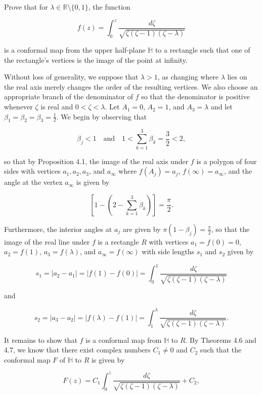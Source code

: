 Prove that for $\lambda \in \mathbb{R} \setminus \{0, 1\}$, the function

$$
f(z) = \int_0^z \frac{d\zeta}{\sqrt{\zeta (\zeta - 1)(\zeta - \lambda)}}
$$

is a conformal map from the upper half-plane $\mathbb{H}$ to a rectangle such that one of the rectangle's vertices is 
the image of the point at infinity.

\begin{solution} 
  Without loss of generality, we suppose that $\lambda > 1$, as changing where $\lambda$ lies on the real axis merely 
  changes the order of the resulting vertices. We also choose an appropriate branch of the denominator of $f$ so that 
  the denominator is positive whenever $\zeta$ is real and $0 < \zeta < \lambda$. Let $A_1 = 0$, $A_2 = 1$, and 
  $A_3 = \lambda$ and let $\beta_1 = \beta_2 = \beta_3 = \frac{1}{2}$. We begin by observing that 

  $$
  \beta_j < 1 \quad \text{and} \quad 1 < \sum_{k=1}^{3} \beta_k = \frac{3}{2} < 2,
  $$

  so that by Proposition 4.1, the image of the real axis under $f$ is a polygon of four sides with vertices 
  $a_1, a_2, a_3$, and $a_{\infty}$ where $f(A_j) = a_j$, $f(\infty) = a_{\infty}$, and the angle at the vertex 
  $a_{\infty}$ is given by 
  
  $$
    \left[1 - \left(2 - \sum\limits_{k = 1}^3 \beta_k \right) \right] = \frac{\pi}{2}.
  $$

  Furthermore, the interior angles at $a_j$ are given by $\pi (1 - \beta_j) = \frac{\pi}{2}$, so that the image of the 
  real line under $f$ is a rectangle $R$ with vertices $a_1 = f(0) = 0$, $a_2 = f(1)$, $a_3 = f(\lambda)$, and 
  $a_{\infty} = f(\infty)$ with side lengths $s_1$ and $s_2$ given by
 
  $$
  s_1 = |a_2 - a_1| = \left|f(1) - f(0)\right| = \int_0^1 \frac{d\zeta}{\sqrt{\zeta(\zeta - 1)(\zeta - \lambda)}}
  $$

  and 

  $$
  s_2 = |a_3 - a_2| = \left|f(\lambda) - f(1)\right| = \int_1^{\lambda} \frac{d\zeta}{\sqrt{\zeta(\zeta - 1)(\zeta - \lambda)}}.
  $$
  
  It remains to show that $f$ is a conformal map from $\mathbb{H}$ to $R$. By Theorems 4.6 and 4.7, we know that there 
  exist complex numbers $C_1 \neq 0$ and $C_2$ such that the conformal map $F$ of $\mathbb{H}$ to $R$ is given by

  $$
  F(z) = C_1 \int_0^z \frac{d\zeta}{\sqrt{\zeta(\zeta - 1)(\zeta - \lambda)}} + C_2,
  $$


\end{solution}
